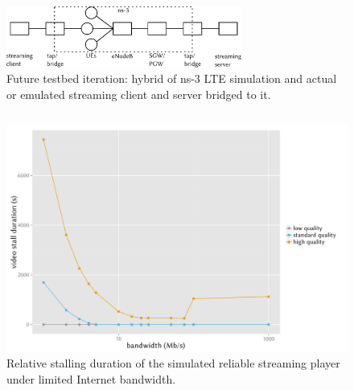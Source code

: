 \documentclass{beamer}
\begin{document}
\begin{frame}
	\begin{figure}
		\centering
		\includegraphics[height=2cm]{../../chapters/06-mobilestreamingmeasurements/images/streaming-hybrid.pdf}
		\caption{Future testbed iteration: hybrid of ns-3 LTE simulation and actual or emulated streaming client and server bridged to it.}
	\end{figure}
\end{frame}

\begin{frame}
	\begin{columns}
		\begin{figure}
			\includegraphics[width=\columnwidth]{../../chapters/06-mobilestreamingmeasurements/images/R-ltesim-bwseries-stallduration.pdf}
			\caption{Relative stalling duration of the simulated reliable streaming player under limited Internet bandwidth.}
		\end{figure}


\end{columns}
\end{frame}
\end{document}
